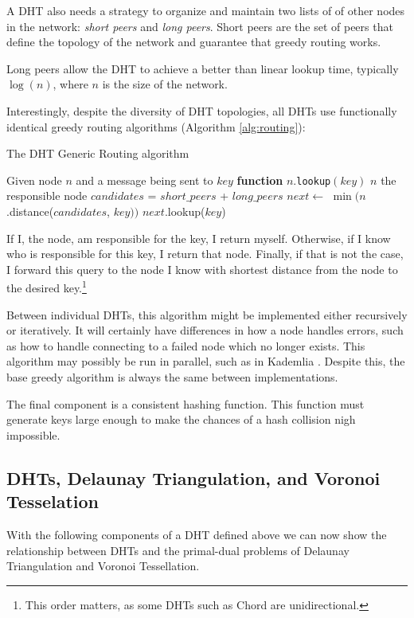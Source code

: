 \documentclass[11pt,conference]{IEEEtran}
\begin{document}
A DHT also needs a strategy to organize and maintain two lists of of other nodes in the network: \textit{short peers} and \textit{long peers}.
Short peers are the set of peers that define the topology of the network and guarantee that greedy routing works.

Long peers allow the DHT to achieve a better than linear lookup time, typically $ \log(n) $, where $n$ is the size of the network. 

Interestingly, despite the diversity of DHT topologies, all DHTs use functionally identical greedy routing algorithms (Algorithm \ref{alg:routing}):

\begin{algorithm}
	\caption{The DHT Generic Routing algorithm}
	\label{alg:routing}
	\begin{algorithmic}[1]
		\STATE Given node $n$ and a message being sent to $key$
		\STATE \textbf{function} $n.$\texttt{lookup}$(key)$
			\RETURN $ n $
		\ENDIF
			\RETURN the responsible node
		\ENDIF
		\STATE $ candidates $ = $ short\_peers $ + $ long\_peers $
		\STATE $ next  \leftarrow $  $\min (n$.distance($candidates$, $ key ))$
		\RETURN $next.$lookup($key$)
	\end{algorithmic}
	
	\scriptsize
\end{algorithm}
If I, the node, am responsible for the key, I return myself.
Otherwise, if I know who is responsible for this key, I return that node.
Finally, if that is not the case, I forward this query to the node I know with shortest distance from the node to the desired key.\footnote{This order matters, as some DHTs such as Chord are unidirectional.} 

Between individual DHTs, this algorithm might be implemented either recursively or iteratively.
It will certainly have differences in how a node handles errors, such as how to handle connecting to a failed node which no longer exists.
This algorithm may possibly be  run in parallel, such as in Kademlia \cite{kademlia}.
Despite this, the base greedy algorithm is always the same between implementations.

The final component is a consistent hashing function.
This function must generate keys large enough to make the chances of a hash collision nigh impossible.

\subsection{DHTs, Delaunay Triangulation, and Voronoi Tesselation}
With the following components of a DHT defined above we can now show the relationship between DHTs and the primal-dual problems of Delaunay Triangulation and Voronoi Tessellation.
\end{document}
